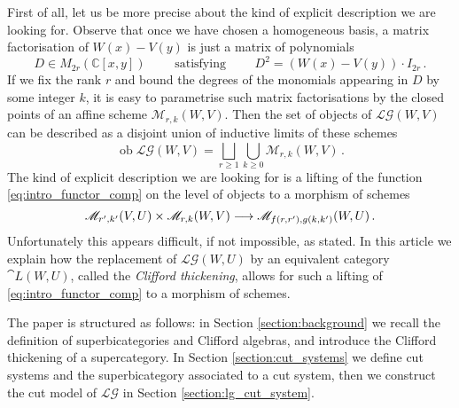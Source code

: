 \documentclass[english,letter paper,12pt,leqno]{article}
\theoremstyle{example}
\numberwithin{equation}{section}
\def\LG{\mathcal{LG}}
\def\be{\begin{equation}}
\def\ee{\end{equation}}
\def\nC{\mathds{C}}
\begin{document}
First of all, let us be more precise about the kind of explicit description we are looking for. Observe that once we have chosen a homogeneous basis, a matrix factorisation of $W(x) - V(y)$ is just a matrix of polynomials
\[
D \in M_{2r}( \nC[x,y] ) \qquad \text{ satisfying } \qquad D^2 = (W(x) - V(y)) \cdot I_{2r}\,.
\]
If we fix the rank $r$ and bound the degrees of the monomials appearing in $D$ by some integer $k$, it is easy to parametrise such matrix factorisations by the closed points of an affine scheme $\mathscr{M}_{r,k}(W,V)$. Then the set of objects of $\LG(W,V)$ can be described as a disjoint union of inductive limits of these schemes
\[
\operatorname{ob} \LG(W,V) = \bigsqcup_{r \ge 1} \bigcup_{k \ge 0} \mathscr{M}_{r,k}(W,V)\,.
\]
The kind of explicit description we are looking for is a lifting of the function \eqref{eq:intro_functor_comp} on the level of objects to a morphism of schemes
\be\label{eq:composition_as_schememap}
\mathscr{M}_{r',k'}(V,U) \times \mathscr{M}_{r,k}(W,V) \lto \mathscr{M}_{f(r,r'),g(k,k')}(W, U)\,.
\ee
Unfortunately this appears difficult, if not impossible, as stated. In this article we explain how the replacement of $\LG(W,U)$ by an equivalent category $\cat{L}(W,U)$, called the \textsl{Clifford thickening}, allows for such a lifting of \eqref{eq:intro_functor_comp} to a morphism of schemes.

\medskip

The paper is structured as follows: in Section \ref{section:background} we recall the definition of superbicategories and Clifford algebras, and introduce the Clifford thickening of a supercategory. In Section \ref{section:cut_systems} we define cut systems and the superbicategory associated to a cut system, then we construct the cut model of $\LG$ in Section \ref{section:lg_cut_system}.
\end{document}
